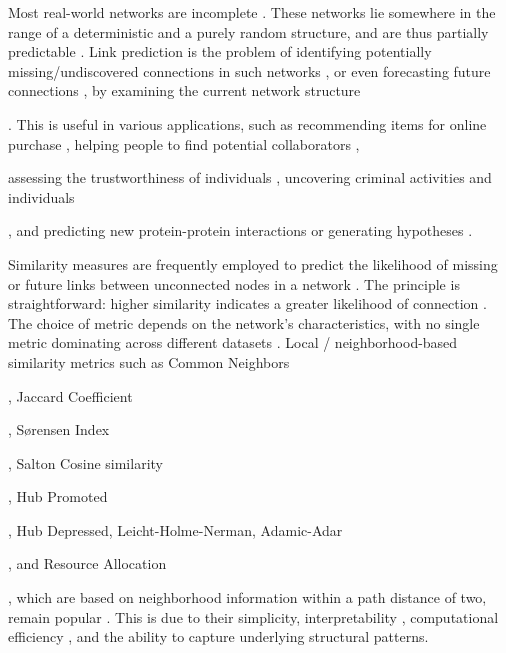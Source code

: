 Most real-world networks are incomplete \cite{kim2011network, wang2014link}. These networks lie somewhere in the range of a deterministic and a purely random structure, and are thus partially predictable \cite{lu2015toward}. Link prediction is the problem of identifying potentially missing/undiscovered connections in such networks \cite{marchette2008predicting, kim2011network}, or even forecasting future connections \cite{bringmann2010learning, juszczyszyn2011link}, by examining the current network structure. This is useful in various applications, such as recommending items for online purchase \cite{akcora2011network}, helping people to find potential collaborators \cite{mori2012machine, tang2012cross}, assessing the trustworthiness of individuals \cite{alnumay2019trust}, uncovering criminal activities and individuals \cite{berlusconi2016link, lim2019hidden}, and predicting new protein-protein interactions or generating hypotheses \cite{cannistraci2013link, nasiri2021novel}.

Similarity measures are frequently employed to predict the likelihood of missing or future links between unconnected nodes in a network \cite{wang2014link, arrar2023comprehensive}. The principle is straightforward: higher similarity indicates a greater likelihood of connection \cite{wang2014link}. The choice of metric depends on the network's characteristics, with no single metric dominating across different datasets \cite{arrar2023comprehensive, zhou2021progresses}. Local / neighborhood-based similarity metrics such as Common Neighbors, Jaccard Coefficient, S{\o}rensen Index, Salton Cosine similarity, Hub Promoted, Hub Depressed, Leicht-Holme-Nerman, Adamic-Adar, and Resource Allocation, which are based on neighborhood information within a path distance of two, remain popular \cite{arrar2023comprehensive, wang2014link}. This is due to their simplicity, interpretability \cite{pai2019netdx, barbieri2014follow}, computational efficiency \cite{garcia2014link}, and the ability to capture underlying structural patterns.

